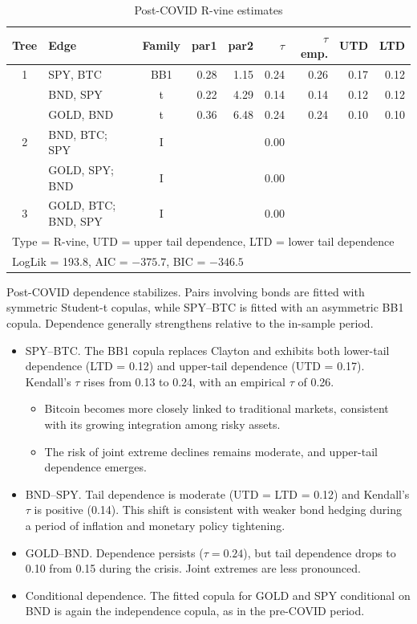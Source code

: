 \documentclass[12pt,a4paper]{article}
\begin{document}
\begin{table}[H]
\centering
\begin{tabular}{clcrrrrrr}
\toprule
Tree & Edge & Family & par1 & par2 & $\tau$ & $\tau$ emp. & UTD & LTD \\
\midrule
1 & SPY, BTC & BB1 & 0.28 & 1.15 & 0.24 & 0.26 & 0.17 & 0.12 \\
  & BND, SPY & t & 0.22 & 4.29 & 0.14 & 0.14 & 0.12 & 0.12 \\
  & GOLD, BND & t & 0.36 & 6.48 & 0.24 & 0.24 & 0.10 & 0.10 \\
2 & BND, BTC; SPY & I & & & 0.00 & & & \\
  & GOLD, SPY; BND & I & & & 0.00 & & & \\
3 & GOLD, BTC; BND, SPY & I & & & 0.00 & & & \\
\bottomrule
\multicolumn{9}{l}{\footnotesize Type = R-vine, UTD = upper tail dependence, LTD = lower tail dependence} \\
\multicolumn{9}{l}{\footnotesize LogLik = 193.8, AIC = $-375.7$, BIC = $-346.5$} \\
\end{tabular}
\caption{Post-COVID R-vine estimates}
\end{table}

Post-COVID dependence stabilizes. Pairs involving bonds are fitted with symmetric Student-t copulas, while SPY--BTC is fitted with an asymmetric BB1 copula. Dependence generally strengthens relative to the in-sample period.
\begin{itemize}
  \item SPY--BTC. The BB1 copula replaces Clayton and exhibits both lower-tail dependence (LTD = 0.12) and upper-tail dependence (UTD = 0.17). Kendall's $\tau$ rises from 0.13 to 0.24, with an empirical $\tau$ of 0.26.
  \begin{itemize}
    \item Bitcoin becomes more closely linked to traditional markets, consistent with its growing integration among risky assets.
    \item The risk of joint extreme declines remains moderate, and upper-tail dependence emerges.
  \end{itemize}
  \item BND--SPY. Tail dependence is moderate (UTD = LTD = 0.12) and Kendall's $\tau$ is positive (0.14). This shift is consistent with weaker bond hedging during a period of inflation and monetary policy tightening.
  \item GOLD--BND. Dependence persists ($\tau=0.24$), but tail dependence drops to 0.10 from 0.15 during the crisis. Joint extremes are less pronounced.
  \item Conditional dependence. The fitted copula for GOLD and SPY conditional on BND is again the independence copula, as in the pre-COVID period.
\end{itemize}
\end{document}
